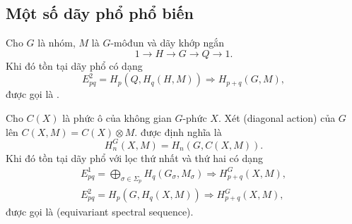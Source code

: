 \subsection{Một số dãy phổ phổ biến}
\begin{theorem}\label{thm:hoschschild-spec}
    Cho $G$ là nhóm, $M$ là $G$-môđun và dãy khớp ngắn
    $$
        1 \rightarrow H \rightarrow G \rightarrow Q \rightarrow 1.
    $$
    Khi đó tồn tại dãy phổ có dạng
    $$
        E_{pq}^2 = H_p(Q, H_q(H,M)) \Rightarrow H_{p+q}(G,M),
    $$
    được gọi là .
\end{theorem}

\begin{theorem}\label{thm:equiv-spec}
    Cho $C(X)$ là phức ô của không gian $G$-phức $X$. Xét  (diagonal action) của $G$ lên $C(X,M) = C(X) \otimes M$.  được định nghĩa là
    $$
        H_n^G(X,M) = H_n(G, C(X,M)).
    $$
    Khi đó tồn tại dãy phổ với lọc thứ nhất và thứ hai có dạng
    \begin{align*}
        E_{pq}^1 = \bigoplus_{\sigma \in \Sigma_p} H_q(G_{\sigma}, M_\sigma) \Rightarrow H_{p+q}^G(X,M), \\
        E_{pq}^2 = H_p(G,H_q(X,M)) \Rightarrow H_{p+q}^G(X,M),
    \end{align*}
    được gọi là  (equivariant spectral sequence).
\end{theorem}
